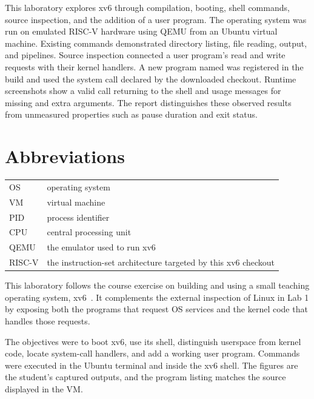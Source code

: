 \documentclass{../latex/utmreport}
\begin{document}
\makeutmreporttitlepage
\tableofcontents
\clearpage

\begin{utmabstract}[Abstract]
This laboratory explores xv6 through compilation, booting, shell commands,
source inspection, and the addition of a user program. The operating system
was run on emulated RISC-V hardware using QEMU from an Ubuntu virtual
machine. Existing commands demonstrated directory listing, file reading,
output, and pipelines. Source inspection connected a user program's read
and write requests with their kernel handlers. A new program named
 was registered in the build and used the  system
call declared by the downloaded checkout. Runtime screenshots show a valid
call returning to the shell and usage messages for missing and extra
arguments. The report distinguishes these observed results from unmeasured
properties such as pause duration and exit status.
\end{utmabstract}

\chapter*{Abbreviations}
\noindent\begin{tabularx}{\textwidth}{lY}
OS & operating system \\
VM & virtual machine \\
PID & process identifier \\
CPU & central processing unit \\
QEMU & the emulator used to run xv6 \\
RISC-V & the instruction-set architecture targeted by this xv6 checkout \\
\end{tabularx}

\utmintroduction
This laboratory follows the course exercise on building and using a small
teaching operating system, xv6~\cite{handout}. It complements the external
inspection of Linux in Lab 1 by exposing both the programs that request OS
services and the kernel code that handles those requests.

The objectives were to boot xv6, use its shell, distinguish userspace from
kernel code, locate system-call handlers, and add a working user program.
Commands were executed in the Ubuntu terminal and inside the xv6 shell.
The figures are the student's captured outputs, and the program listing
matches the source displayed in the VM.
\end{document}
